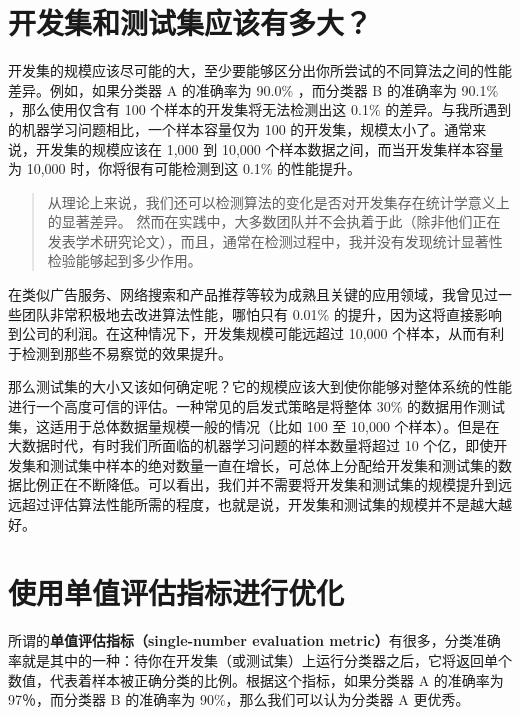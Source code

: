 \hypertarget{ux5f00ux53d1ux96c6ux548cux6d4bux8bd5ux96c6ux5e94ux8be5ux6709ux591aux5927}{%
\chapter{开发集和测试集应该有多大？}\label{ux5f00ux53d1ux96c6ux548cux6d4bux8bd5ux96c6ux5e94ux8be5ux6709ux591aux5927}}

开发集的规模应该尽可能的大，至少要能够区分出你所尝试的不同算法之间的性能差异。例如，如果分类器
A 的准确率为 90.0\% ，而分类器 B 的准确率为 90.1\% ，那么使用仅含有 100
个样本的开发集将无法检测出这 0.1\%
的差异。与我所遇到的机器学习问题相比，一个样本容量仅为 100
的开发集，规模太小了。通常来说，开发集的规模应该在 1,000 到 10,000
个样本数据之间，而当开发集样本容量为 10,000 时，你将很有可能检测到这
0.1\% 的性能提升。

\begin{quote}
从理论上来说，我们还可以检测算法的变化是否对开发集存在统计学意义上的显著差异。
然而在实践中，大多数团队并不会执着于此（除非他们正在发表学术研究论文），而且，通常在检测过程中，我并没有发现统计显著性检验能够起到多少作用。
\end{quote}

在类似广告服务、网络搜索和产品推荐等较为成熟且关键的应用领域，我曾见过一些团队非常积极地去改进算法性能，哪怕只有
0.01\%
的提升，因为这将直接影响到公司的利润。在这种情况下，开发集规模可能远超过
10,000 个样本，从而有利于检测到那些不易察觉的效果提升。

那么测试集的大小又该如何确定呢？它的规模应该大到使你能够对整体系统的性能进行一个高度可信的评估。一种常见的启发式策略是将整体
30\% 的数据用作测试集，这适用于总体数据量规模一般的情况（比如 100 至
10,000
个样本）。但是在大数据时代，有时我们所面临的机器学习问题的样本数量将超过
10
个亿，即使开发集和测试集中样本的绝对数量一直在增长，可总体上分配给开发集和测试集的数据比例正在不断降低。可以看出，我们并不需要将开发集和测试集的规模提升到远远超过评估算法性能所需的程度，也就是说，开发集和测试集的规模并不是越大越好。

\hypertarget{ux4f7fux7528ux5355ux503cux8bc4ux4f30ux6307ux6807ux8fdbux884cux4f18ux5316}{%
\chapter{使用单值评估指标进行优化}\label{ux4f7fux7528ux5355ux503cux8bc4ux4f30ux6307ux6807ux8fdbux884cux4f18ux5316}}

所谓的\textbf{单值评估指标（single-number evaluation
metric）}有很多，分类准确率就是其中的一种：待你在开发集（或测试集）上运行分类器之后，它将返回单个数值，代表着样本被正确分类的比例。根据这个指标，如果分类器
A 的准确率为 97％，而分类器 B 的准确率为 90\%，那么我们可以认为分类器 A
更优秀。


